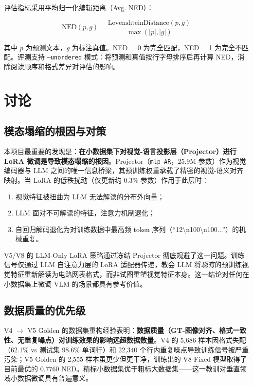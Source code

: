 评估指标采用平均归一化编辑距离（Avg. NED）：

\begin{equation}
\text{NED}(p, g) = \frac{\text{LevenshteinDistance}(p, g)}{\max(|p|, |g|)}
\end{equation}

其中 $p$ 为预测文本，$g$ 为标注真值。NED = 0 为完全匹配，NED = 1 为完全不匹配。评测支持 \texttt{--unordered} 模式：将预测和真值按行字母排序后再计算 NED，消除阅读顺序和格式差异对评估的影响。


\section{讨论}

\subsection{模态塌缩的根因与对策}

本项目最重要的发现是：\textbf{在小数据集下对视觉-语言投影层（Projector）进行 LoRA 微调是导致模态塌缩的根因}。Projector（\texttt{mlp\_AR}，25.9M 参数）作为视觉编码器与 LLM 之间的唯一信息桥梁，其预训练权重承载了精密的视觉-语义对齐映射。当 LoRA 的低秩扰动（仅更新约 0.3\% 参数）作用于此层时：

\begin{enumerate}[nosep]
    \item 视觉特征被扭曲为 LLM 无法解读的分布外向量；
    \item LLM 面对不可解读的特征，注意力机制退化；
    \item 自回归解码退化为对训练数据中最高频 token 序列（``12\textbackslash n100\textbackslash n100...''）的机械重复。
\end{enumerate}

V5/V8 的 LLM-Only LoRA 策略通过冻结 Projector 彻底规避了这一问题。训练信号仅通过 LLM 自注意力层的 LoRA 适配器传递，教会 LLM 将\emph{现有}的预训练视觉特征重新解读为电路网表格式，而非试图重塑视觉特征本身。这一结论对任何在小数据集上微调 VLM 的场景都具有参考价值。

\subsection{数据质量的优先级}

V4 $\to$ V5 Golden 的数据集重构经验表明：\textbf{数据质量（GT-图像对齐、格式一致性、无重复噪点）对训练效果的影响远超数据数量}。V4 的 5,686 样本因格式失配（62.1\% vs 测试集 98.6\% 单词行）和 22,340 个行内重复噪点导致训练信号被严重污染；V5 Golden 的 2,555 样本虽更少但更干净，训练出的 V8-Fixed 模型取得了目前最优的 0.7760 NED。精标小数据集优于粗标大数据集——这一教训对垂直领域小数据微调具有普遍意义。

